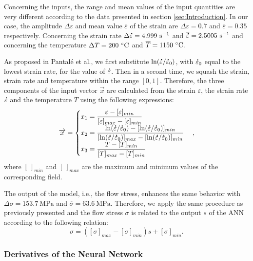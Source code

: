 \documentclass[algorithms,article,submit,pdftex,moreauthors]{Definitions/mdpi}
\makeatletter
\DeclareRobustCommand{\mdot}[1]{\accentset{\mbox{\bfseries .}}{#1}}
\DeclareRobustCommand{\ie}{i.e.,\@\xspace}
\DeclareRobustCommand{\eal}{et al.\@\xspace}
\DeclareRobustCommand{\ps}{\text{s}^{-1}}
\DeclareRobustCommand{\MPa}{\text{MPa}}
\makeatother
\begin{document}
Concerning the inputs, the range and mean values of the input quantities are very different according to the data presented in section \ref{sec:Introduction}.
In our case, the amplitude $\Delta\varepsilon$ and mean value $\overline\varepsilon$ of the strain are $\Delta\varepsilon=0.7$ and $\overline\varepsilon=0.35$ respectively.
Concerning the strain rate $\Delta\mdot{\varepsilon}=4.999~\ps$ and $\overline{\mdot{\varepsilon}}=2.5005~\ps$ and concerning the temperature $\Delta T=200~\celsius$ and $\overline T=1150~\celsius$.

As proposed in Pantalé \eal \cite{Pantale-2021-EIN}, we first substitute  $\ln(\mdot{\varepsilon}/\mdot{\varepsilon}_0)$, with $\mdot{\varepsilon}_0$ equal to the lowest strain rate, for the value of $\mdot{\varepsilon}$.
Then in a second time, we squash the strain, strain rate and temperature within the range $[0,1]$.
Therefore, the three components of the input vector $\overrightarrow{x}$ are calculated from the strain $\varepsilon$, the strain rate $\mdot{\varepsilon}$ and the temperature $T$ using the following expressions:
\begin{equation}
\overrightarrow{x}=
\begin{cases}
x_1 = \dfrac{\varepsilon - [\varepsilon]_{min}}{[\varepsilon]_{max} - [\varepsilon]_{min}}\\
x_2 = \dfrac{\ln(\mdot{\varepsilon}/\mdot{\varepsilon}_0)-[\ln(\mdot{\varepsilon}/\mdot{\varepsilon}_0)]_{min}}{[\ln(\mdot{\varepsilon}/\mdot{\varepsilon}_0)]_{max}-[\ln(\mdot{\varepsilon}/\mdot{\varepsilon}_0)]_{min}}\\
x_3 = \dfrac{T-[T]_{min}}{[T]_{max}-[T]_{min}}
\end{cases},
\label{eq:ANN-input}
\end{equation}
where $[~]_{min}$ and $[~]_{max}$  are the maximum and minimum values of the corresponding field.

The output of the model, \ie the flow stress, enhances the same behavior with $\Delta\sigma=153.7~\MPa$ and $\overline\sigma=63.6~\MPa$. Therefore, we apply the same procedure as previously presented and the flow stress $\sigma$ is related to the output $s$ of the ANN according to the following relation:
\begin{equation}
\sigma =  \left([\sigma]_{max}-[\sigma]_{min}\right)s + [\sigma]_{min}.\label{eq:ANN-output}
\end{equation}

\subsubsection{Derivatives of the Neural Network}\label{subsubsec:ANN-der}
\end{document}
